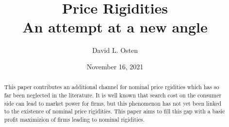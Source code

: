 \documentclass[BufferStockTheory]{subfiles}
\begin{document}
\providecommand{\versn}{pdf} %
\ifthenelse{\boolean{Web}}{    %
  \renewcommand{\versn}{Web}     %
  \renewcommand{\rootFromOut}{.} %
}{}  %


\title{Price Rigidities \\ An attempt at a new angle}

\author{David L. Osten\authNum}



\renewcommand{\forcedate}{November 16, 2021}\date{\forcedate}

\maketitle
\hypertarget{abstract}{}
\begin{abstract}
This paper contributes an additional channel for nominal price rgidities which has so far been neglected in the literature. It is well known that search cost on the consumer side can lead to market power for firms, but this phenomenon has not yet been linked to the existence of nominal price rigidities. This paper aims to fill this gap with a basic profit maximizion of firms leading to nominal rigidities.
\end{abstract}


\hypertarget{links}{}
\end{document}

